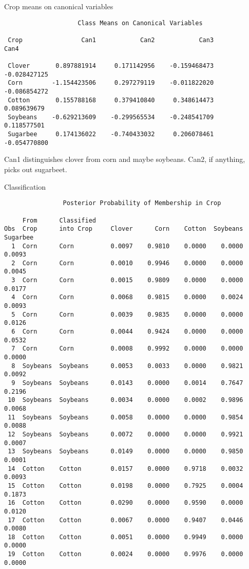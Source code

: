 \documentclass[pdf]{prosper}
\begin{document}
\begin{slide}{Crop means on canonical variables}

{\scriptsize
\begin{verbatim}
                    Class Means on Canonical Variables
 
 Crop                Can1            Can2            Can3            Can4

 Clover       0.897881914     0.171142956    -0.159468473    -0.028427125
 Corn        -1.154423506     0.297279119    -0.011822020    -0.086854272
 Cotton       0.155788168     0.379410840     0.348614473     0.089639679
 Soybeans    -0.629213609    -0.299565534    -0.248541709     0.118577501
 Sugarbee     0.174136022    -0.740433032     0.206078461    -0.054770800

\end{verbatim}
}

Can1 distinguishes clover from corn and maybe soybeans. Can2, if anything, picks out sugarbeet.
  
\end{slide}

\begin{slide}{Classification}
  
{\scriptsize
\begin{verbatim}
                Posterior Probability of Membership in Crop
 
     From      Classified
Obs  Crop      into Crop     Clover      Corn    Cotton  Soybeans  Sugarbee
  1  Corn      Corn          0.0097    0.9810    0.0000    0.0000    0.0093
  2  Corn      Corn          0.0010    0.9946    0.0000    0.0000    0.0045
  3  Corn      Corn          0.0015    0.9809    0.0000    0.0000    0.0177
  4  Corn      Corn          0.0068    0.9815    0.0000    0.0024    0.0093
  5  Corn      Corn          0.0039    0.9835    0.0000    0.0000    0.0126
  6  Corn      Corn          0.0044    0.9424    0.0000    0.0000    0.0532
  7  Corn      Corn          0.0008    0.9992    0.0000    0.0000    0.0000
  8  Soybeans  Soybeans      0.0053    0.0033    0.0000    0.9821    0.0092
  9  Soybeans  Soybeans      0.0143    0.0000    0.0014    0.7647    0.2196
 10  Soybeans  Soybeans      0.0034    0.0000    0.0002    0.9896    0.0068
 11  Soybeans  Soybeans      0.0058    0.0000    0.0000    0.9854    0.0088
 12  Soybeans  Soybeans      0.0072    0.0000    0.0000    0.9921    0.0007
 13  Soybeans  Soybeans      0.0149    0.0000    0.0000    0.9850    0.0001
 14  Cotton    Cotton        0.0157    0.0000    0.9718    0.0032    0.0093
 15  Cotton    Cotton        0.0198    0.0000    0.7925    0.0004    0.1873
 16  Cotton    Cotton        0.0290    0.0000    0.9590    0.0000    0.0120
 17  Cotton    Cotton        0.0067    0.0000    0.9407    0.0446    0.0080
 18  Cotton    Cotton        0.0051    0.0000    0.9949    0.0000    0.0000
 19  Cotton    Cotton        0.0024    0.0000    0.9976    0.0000    0.0000
\end{verbatim}
}
\end{slide}
\end{document}
